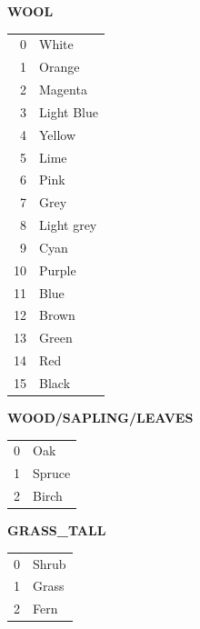 \documentclass[twocolumn]{geocraft-worksheet-multipage}
\begin{document}
\clearpage

\textbf{WOOL}
\begin{center}




    \tabletail{\hline}

    \tablelasttail{\hline}


\begin{supertabular} { | r | l | }
0 & White \\
1 & Orange \\
2 & Magenta \\
3 & Light Blue \\
4 & Yellow \\
5 & Lime \\
6 & Pink \\
7 & Grey \\
8 & Light grey \\
9 & Cyan \\
10 & Purple \\
11 & Blue \\
12 & Brown \\
13 &Green \\
14 & Red \\
15 & Black \\
\end{supertabular}
\end{center}

\textbf{WOOD/SAPLING/LEAVES}\vspace{-0.2cm}
\begin{center}
\begin{supertabular} { | r | l | }
0 & Oak \\
1 & Spruce \\
2 & Birch \\
\end{supertabular}
\end{center}

\textbf{GRASS\_TALL}\vspace{-0.2cm}
\begin{center}
\begin{supertabular} { | r | l | }
0 & Shrub \\
1 & Grass \\
2 & Fern \\
\end{supertabular}
\end{center}
\end{document}
